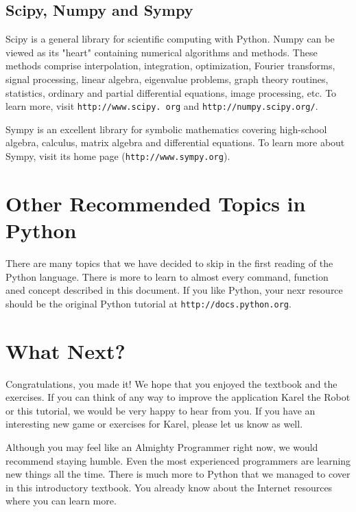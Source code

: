 \documentclass[article,A4,12pt]{llncs}
\begin{document}
\subsection{Scipy, Numpy and Sympy}

Scipy is a general library for scientific computing with 
Python. Numpy can be viewed as its "heart" containing numerical 
algorithms and methods. These methods comprise interpolation, 
integration, optimization, Fourier transforms, signal processing, 
linear algebra, eigenvalue problems, graph theory routines,
statistics, ordinary and partial differential equations,
image processing, etc. To learn more, visit 
{\tt http://www.scipy. org} and {\tt http://numpy.scipy.org/}. 

Sympy is an excellent library for symbolic mathematics covering high-school 
algebra, calculus, matrix algebra and differential equations. To learn more
about Sympy, visit its home page ({\tt http://www.sympy.org}).


\section{Other Recommended Topics in Python} \label{sec:adv}

There are many topics that we have decided to skip in the first reading 
of the Python language. There is more to learn to almost every command,
function aned concept described in this document. If you like Python,
your nexr resource should be the original Python tutorial at 
{\tt http://docs.python.org}. 

\section{What Next?}

Congratulations, you made it! We hope that you enjoyed the textbook and the 
exercises. If you can think of any way to improve the application Karel the 
Robot or this tutorial, we would be very happy to hear from you. If you 
have an interesting new game or exercises for Karel, please let us know as well. 

Although you may feel like an Almighty Programmer right now, we would
recommend staying humble. Even the most experienced programmers are
learning new things all the time. There is much more to Python that 
we managed to cover in this introductory textbook. You already know 
about the Internet resources where you can learn more.  
\end{document}
